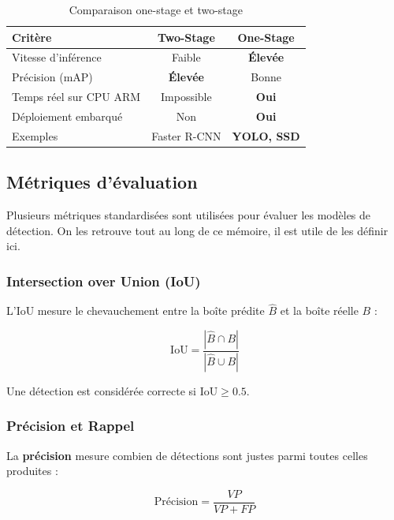 \begin{table}[H]
\centering
\caption{Comparaison one-stage et two-stage}
\begin{tabularx}{\textwidth}{Xcc}
\toprule
\textbf{Critère} &
\textbf{Two-Stage} &
\textbf{One-Stage} \\
\midrule
Vitesse d'inférence &
Faible & \textbf{Élevée} \\
Précision (mAP) &
\textbf{Élevée} & Bonne \\
Temps réel sur CPU ARM &
Impossible & \textbf{Oui} \\
Déploiement embarqué &
Non & \textbf{Oui} \\
Exemples &
Faster R-CNN & \textbf{YOLO, SSD} \\
\bottomrule
\end{tabularx}
\label{tab:one_two_stage}
\end{table}

\subsection{Métriques d'évaluation}

Plusieurs métriques standardisées sont utilisées
pour évaluer les modèles de détection. On les
retrouve tout au long de ce mémoire, il est
utile de les définir ici.

\subsubsection{Intersection over Union (IoU)}

L'IoU mesure le chevauchement entre la boîte
prédite $\hat{B}$ et la boîte réelle $B$ :

\begin{equation}
\text{IoU} = \frac{|\hat{B} \cap B|}
             {|\hat{B} \cup B|}
\label{eq:iou}
\end{equation}

Une détection est considérée correcte
si $\text{IoU} \geq 0.5$.

\subsubsection{Précision et Rappel}

La \textbf{précision} mesure combien de
détections sont justes parmi toutes celles
produites :

\begin{equation}
\text{Précision} = \frac{VP}{VP + FP}
\label{eq:precision}
\end{equation}

